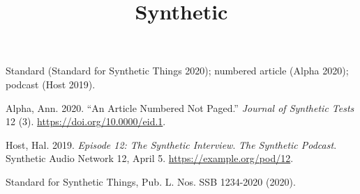 \documentclass[
  letterpaper,
  DIV=11,
  numbers=noendperiod]{scrartcl}
\title{Synthetic}
\author{}
\date{}
\newlength{\cslhangindent}
\newenvironment{CSLReferences}[2] %
 {\begin{list}{}{%
  \setlength{\itemindent}{0pt}
  \setlength{\leftmargin}{0pt}
  \setlength{\parsep}{0pt}
  \ifodd #1
   \setlength{\leftmargin}{\cslhangindent}
   \setlength{\itemindent}{-1\cslhangindent}
  \fi
  \setlength{\itemsep}{#2\baselineskip}}}
 {\end{list}}
\begin{document}
\maketitle


Standard (Standard for Synthetic Things 2020); numbered article (Alpha
2020); podcast (Host 2019).

\protect{}\label{refs}
\begin{CSLReferences}{1}{1}
Alpha, Ann. 2020. {``An Article Numbered Not Paged.''} \emph{Journal of
Synthetic Tests} 12 (3). \url{https://doi.org/10.0000/eid.1}.

Host, Hal. 2019. \emph{Episode 12: The Synthetic Interview}. \emph{The
Synthetic Podcast}. Synthetic Audio Network 12, April 5.
\url{https://example.org/pod/12}.

Standard for Synthetic Things, Pub. L. Nos. SSB 1234-2020 (2020).

\end{CSLReferences}
\end{document}
